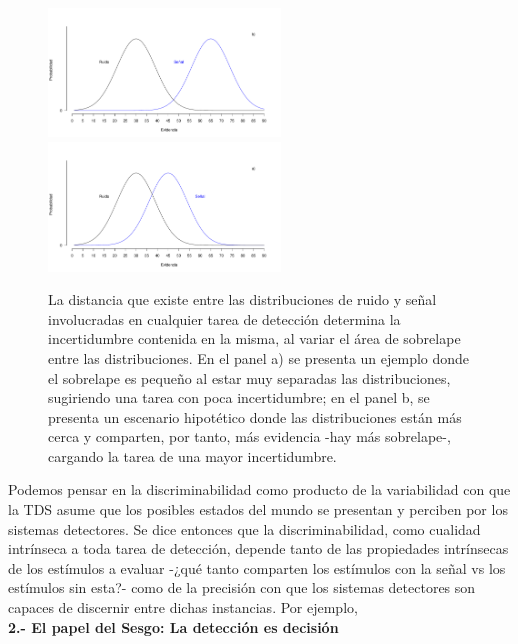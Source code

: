 \begin{figure}[th]
\centering
\includegraphics[width=0.55\textwidth]{Figures/Overlap_Small}\\ 
\includegraphics[width=0.55\textwidth]{Figures/Overlap_Big} 
\caption[El sobrelape Ruido-señal como reflejo de la incertidumbre contenida en tareas de detección]{La distancia que existe entre las distribuciones de ruido y señal involucradas en cualquier tarea de detección determina la incertidumbre contenida en la misma, al variar el área de sobrelape entre las distribuciones. En el panel a) se presenta un ejemplo donde el sobrelape es pequeño al estar muy separadas las distribuciones, sugiriendo una tarea con poca incertidumbre; en el panel b, se presenta un escenario hipotético donde las distribuciones están más cerca y comparten, por tanto, más evidencia -hay más sobrelape-, cargando la tarea de una mayor incertidumbre.}
\label{fig:Overlap}
\end{figure}

Podemos pensar en la discriminabilidad como producto de la variabilidad con que la TDS asume que los posibles estados del mundo se presentan y perciben por los sistemas detectores. Se dice entonces que la discriminabilidad, como cualidad intrínseca a toda tarea de detección, depende tanto de las propiedades intrínsecas de los estímulos a evaluar -¿qué tanto comparten los estímulos con la señal vs los estímulos sin esta?- como de la precisión con que los sistemas detectores son capaces de discernir entre dichas instancias. Por ejemplo, \\

  \textbf{2.- El papel del Sesgo: La detección es decisión}\\





